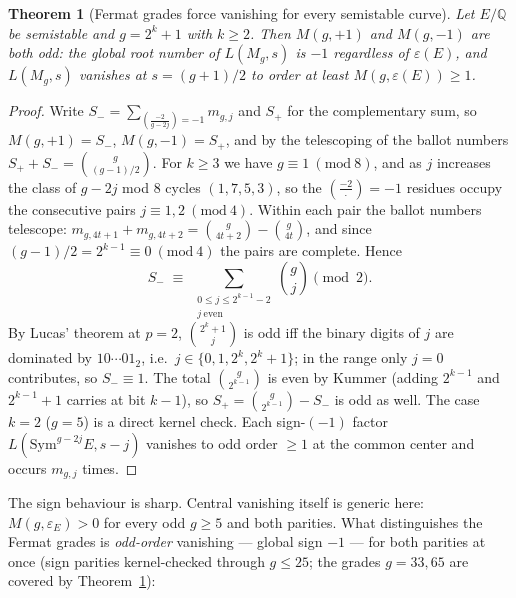 \documentclass[11pt]{article}
\newtheorem{theorem}{Theorem}
\newcommand{\Sym}{\mathrm{Sym}}
\newcommand{\eps}{\varepsilon}
\begin{document}
\begin{theorem}[Fermat grades force vanishing for every semistable curve]\label{thm:global}
Let $E/\mathbb Q$ be semistable and $g=2^k+1$ with $k\ge2$.  Then $M(g,+1)$ and
$M(g,-1)$ are both odd: the global root number of $L(M_g,s)$ is $-1$ regardless of
$\eps(E)$, and $L(M_g,s)$ vanishes at $s=(g+1)/2$ to order at least
$M(g,\eps(E))\ge1$.
\end{theorem}

\begin{proof}
Write $S_-=\sum_{(\frac{-2}{g-2j})=-1}m_{g,j}$ and $S_+$ for the complementary sum,
so $M(g,+1)=S_-$, $M(g,-1)=S_+$, and by the telescoping of the ballot numbers
$S_++S_-=\binom g{(g-1)/2}$.  For $k\ge3$ we have $g\equiv1\ (\mathrm{mod}\ 8)$, and
as $j$ increases the class of $g-2j$ mod $8$ cycles $(1,7,5,3)$, so the
$(\frac{-2}\cdot)=-1$ residues occupy the consecutive pairs $j\equiv1,2\
(\mathrm{mod}\ 4)$.  Within each pair the ballot numbers telescope:
$m_{g,4t+1}+m_{g,4t+2}=\binom g{4t+2}-\binom g{4t}$, and since
$(g-1)/2=2^{k-1}\equiv0\ (\mathrm{mod}\ 4)$ the pairs are complete.  Hence
\[
S_-\;\equiv\;\sum_{\substack{0\le j\le 2^{k-1}-2\\ j\ \mathrm{even}}}\binom gj
\pmod 2 .
\]
By Lucas' theorem at $p=2$, $\binom{2^k+1}j$ is odd iff the binary digits of $j$
are dominated by $10\cdots01_2$, i.e.\ $j\in\{0,1,2^k,2^k+1\}$; in the range only
$j=0$ contributes, so $S_-\equiv1$.  The total $\binom g{2^{k-1}}$ is even by
Kummer (adding $2^{k-1}$ and $2^{k-1}+1$ carries at bit $k-1$), so
$S_+=\binom g{2^{k-1}}-S_-$ is odd as well.  The case $k=2$ ($g=5$) is a direct
kernel check.  Each sign-$(-1)$ factor $L(\Sym^{g-2j}E,s-j)$ vanishes to odd order
$\ge1$ at the common center and occurs $m_{g,j}$ times.
\end{proof}

The sign behaviour is sharp.  Central vanishing itself is generic here:
$M(g,\eps_E)>0$ for every odd $g\ge5$ and both parities.  What distinguishes the
Fermat grades is \emph{odd-order} vanishing --- global sign $-1$ --- for both
parities at once (sign parities kernel-checked through $g\le25$; the grades
$g=33,65$ are covered by Theorem~\ref{thm:global}):
\end{document}

